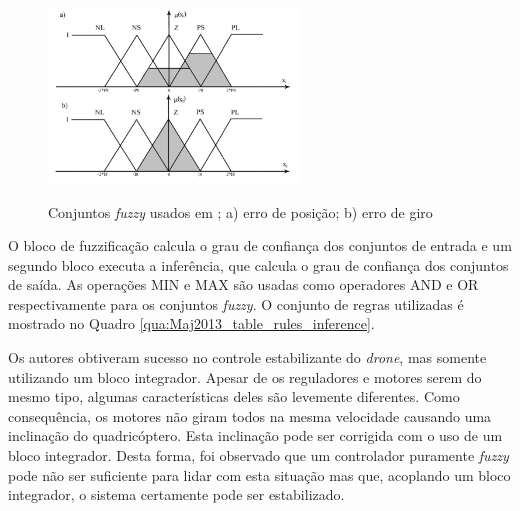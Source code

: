 \begin{figure}[!htb]
    \centering
    \caption{Conjuntos \textit{fuzzy} usados em \cite{Maj2013}; a) erro de posição; b) erro de giro }
    \includegraphics[width=0.6\textwidth]{./04-figuras/Maj2013_fuzzy_sets}
    \label{fig:Maj2013_fuzzy_sets}
\end{figure}

O bloco de fuzzificação calcula o grau de confiança dos conjuntos de entrada e um segundo bloco executa a inferência, que calcula o grau de confiança dos conjuntos de saída. As operações MIN e MAX são usadas como operadores AND e OR respectivamente para os conjuntos \textit{fuzzy}. O conjunto de regras utilizadas é mostrado no Quadro \ref{qua:Maj2013_table_rules_inference}.




Os autores obtiveram sucesso no controle estabilizante do \textit{drone}, mas somente utilizando um bloco integrador. Apesar de os reguladores e motores serem do mesmo tipo, algumas características deles são levemente diferentes. Como consequência, os motores não giram todos na mesma velocidade causando uma inclinação do quadricóptero. Esta inclinação pode ser corrigida com o uso de um bloco integrador. Desta forma, foi observado que um controlador puramente \textit{fuzzy} pode não ser suficiente para lidar com esta situação mas que, acoplando um bloco integrador, o sistema certamente pode ser estabilizado.

